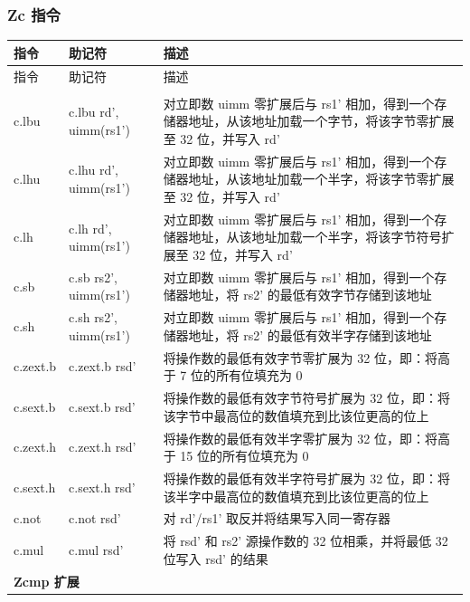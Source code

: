 \documentclass[main\_\_CN.tex]{subfiles}
\begin{document}
\subsubsection{Zc 指令}
\label{sec:riscvcpu-zc-insn-descr}

\begin{longtable}{ | p{2.0cm} | p{4.0cm} |  p{10.0cm} | }
\hline\rowcolor{lightgray}
指令 & 助记符 & 描述  \\ \hline
\endfirsthead
\hline
\rowcolor{lightgray}
指令 & 助记符 & 描述  \\ \hline
\hline
\endhead
\endfoot

\multicolumn{3}{|l|}{\textbf{Zcb 扩展}} \\\hline
c.lbu & c.lbu rd', uimm(rs1') & 对立即数 uimm 零扩展后与 rs1' 相加，得到一个存储器地址，从该地址加载一个字节，将该字节零扩展至 32 位，并写入 rd' \\\hline
c.lhu & c.lhu rd', uimm(rs1') &  对立即数 uimm 零扩展后与 rs1' 相加，得到一个存储器地址，从该地址加载一个半字，将该字节零扩展至 32 位，并写入 rd'\\\hline
c.lh & c.lh rd', uimm(rs1') & 对立即数 uimm 零扩展后与 rs1' 相加，得到一个存储器地址，从该地址加载一个半字，将该字节符号扩展至 32 位，并写入 rd' \\\hline
c.sb & c.sb rs2', uimm(rs1') & 对立即数 uimm 零扩展后与 rs1' 相加，得到一个存储器地址，将 rs2' 的最低有效字节存储到该地址 \\\hline
c.sh & c.sh rs2', uimm(rs1') &  对立即数 uimm 零扩展后与 rs1' 相加，得到一个存储器地址，将 rs2' 的最低有效半字存储到该地址  \\\hline
c.zext.b & c.zext.b rsd' & 将操作数的最低有效字节零扩展为 32 位，即：将高于 7 位的所有位填充为 0 \\\hline
c.sext.b & c.sext.b rsd' & 将操作数的最低有效字节符号扩展为 32 位，即：将该字节中最高位的数值填充到比该位更高的位上  \\\hline
c.zext.h & c.zext.h rsd' &  将操作数的最低有效半字零扩展为 32 位，即：将高于 15 位的所有位填充为 0 \\\hline
c.sext.h  & c.sext.h rsd'  &  将操作数的最低有效半字符号扩展为 32 位，即：将该半字中最高位的数值填充到比该位更高的位上 \\\hline
c.not & c.not rsd' & 对 rd'/rs1' 取反并将结果写入同一寄存器 \\\hline
c.mul & c.mul rsd' & 将 rsd' 和 rs2' 源操作数的 32 位相乘，并将最低 32 位写入 rsd' 的结果 \\\hline

\multicolumn{3}{|l|}{\textbf{Zcmp 扩展}} \\\hline


\end{longtable}
\end{document}
